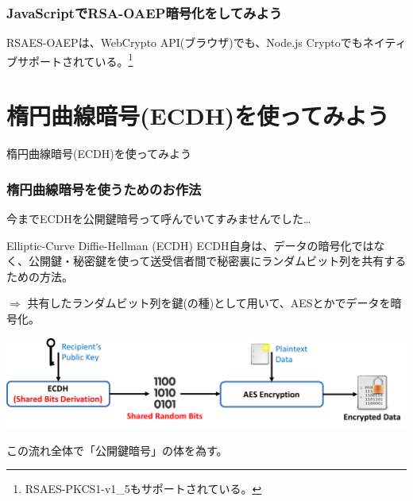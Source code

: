 \documentclass[12pt,dvipdfmx]{beamer}
\begin{document}
\begin{frame}
\frametitle{JavaScriptでRSA-OAEP暗号化をしてみよう}
RSAES-OAEPは、WebCrypto API(ブラウザ)でも、Node.js Cryptoでもネイティブサポートされている。\footnote[frame]{\scriptsize RSAES-PKCS1-v1\_5もサポートされている。}

\end{frame}

\begin{frame}
\end{frame}


\section{楕円曲線暗号(ECDH)を使ってみよう}
\begin{frame}
\centering
{\Large 楕円曲線暗号(ECDH)を使ってみよう}
\end{frame}

\begin{frame}
\frametitle{楕円曲線暗号を使うためのお作法}

今までECDHを公開鍵暗号って呼んでいてすみませんでした…

\begin{block}{\small Elliptic-Curve Diffie-Hellman (ECDH)}
ECDH自身は、データの暗号化ではなく、公開鍵・秘密鍵を使って\alert{送受信者間で秘密裏にランダムビット列を共有するための方法}。
\end{block}

$\Rightarrow$ 共有したランダムビット列を鍵(の種)として用いて、AESとかでデータを暗号化。

\begin{center}
\includegraphics[width=\linewidth]{Figs/ecdh-flow01.pdf}

この流れ全体で「公開鍵暗号」の体を為す。
\end{center}

\end{frame}
\end{document}
